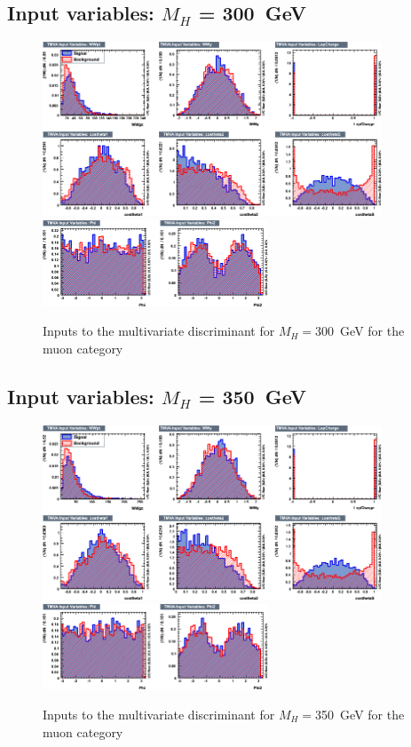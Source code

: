 \subsection{Input variables: \texorpdfstring{$M_H$}{M(H)} = 300~GeV}
\begin{figure}[ht]
  \centering
  \includegraphics[width=0.9\textwidth]{plots/2012_MVA/TMVA_300_nJ2_mu_variables_id_c1.png}
  \includegraphics[width=0.6\textwidth]{plots/2012_MVA/TMVA_300_nJ2_mu_variables_id_c2.png}	
  \caption{\label{fig:inputs300mu}Inputs to the multivariate discriminant for $M_H = $300~GeV for the muon category}
\end{figure}
\newpage
\subsection{Input variables: \texorpdfstring{$M_H$}{M(H)} = 350~GeV}
\begin{figure}[ht]
  \centering
  \includegraphics[width=0.9\textwidth]{plots/2012_MVA/TMVA_350_nJ2_mu_variables_id_c1.png}
  \includegraphics[width=0.6\textwidth]{plots/2012_MVA/TMVA_350_nJ2_mu_variables_id_c2.png}	
  \caption{\label{fig:inputs350mu}Inputs to the multivariate discriminant for $M_H = $350~GeV for the muon category}
\end{figure}
\newpage

